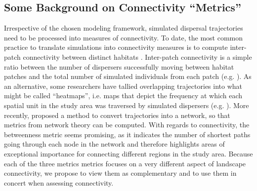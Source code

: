 \documentclass[abstract=on,10pt,a4paper,bibliography=totocnumbered]{article}
\begin{document}
\subsection{Some Background on  Connectivity ``Metrics'' }
Irrespective of the chosen modeling framework, simulated dispersal trajectories
need to be processed into measures of connectivity. To date, the most common
practice to translate simulations into connectivity measures is to compute
inter-patch connectivity between distinct habitats \citep{Diniz.2019}.
Inter-patch connectivity is a simple ratio between the number of dispersers
successfully moving between habitat patches and the total number of simulated
individuals from each patch (e.g. \citealp{Kanagaraj.2013}). As an alternative,
some researchers have tallied overlapping trajectories into what might be called
``heatmaps'', i.e. maps that depict the frequency at which each spatial unit in
the study area was traversed by simulated dispersers (e.g. \citealp{Peer.2008,
Hauenstein.2019, Zeller.2020}). More recently, \cite{BastilleRousseau.2018}
proposed a method to convert trajectories into a network, so that metrics from
network theory can be computed. With regards to connectivity, the betweenness
metric seems promising, as it indicates the number of shortest paths going
through each node in the network and therefore highlights areas of exceptional
importance for connecting different regions in the study area. Because each of
the three metrics metrics focuses on a very different aspect of landscape
connectivity, we propose to view them as complementary and to use them in
concert when assessing connectivity.
\end{document}
